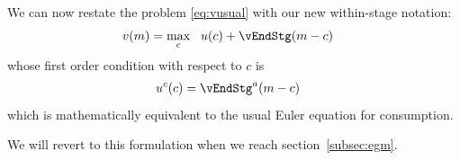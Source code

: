 \documentclass[titlepage, headings=optiontotocandhead]{econtex}
\begin{document}

We can now restate the problem \eqref{eq:vusual} with our new within-stage notation:
\begin{equation}\begin{gathered}\begin{aligned}
      v(m) & = \max_{c} ~~ u(c)+ \vEndStg(m-c)
\end{aligned}\end{gathered}\end{equation}
whose first order condition with respect to $c$ is
\begin{equation}\begin{gathered}\begin{aligned}
  u^{c}(c) &= \vEndStg^{a}(m-c)  \label{eq:upEqbetaOp} %
\end{aligned}\end{gathered}\end{equation}
which is mathematically equivalent to the usual Euler equation for consumption.

We will revert to this formulation when we reach section~\ref{subsec:egm}.


\end{document}
